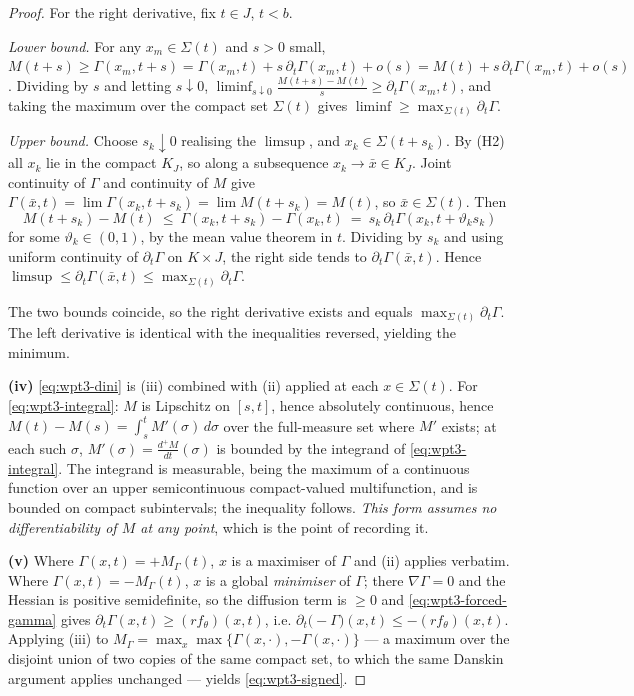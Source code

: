 \documentclass[11pt]{article}
\theoremstyle{definition}
\theoremstyle{remark}
\newcommand{\grad}{\nabla}
\begin{document}
\begin{proof}
  For the right derivative, fix $t\in J$, $t<b$.

  \emph{Lower bound.} For any $x_m\in\Sigma(t)$ and $s>0$ small,
  $M(t+s)\geq\Gamma(x_m,t+s)=\Gamma(x_m,t)+s\,\partial_t\Gamma(x_m,t)+o(s)
   =M(t)+s\,\partial_t\Gamma(x_m,t)+o(s)$. Dividing by $s$ and letting
  $s\downarrow0$,
  $\liminf_{s\downarrow0}\frac{M(t+s)-M(t)}{s}\geq\partial_t\Gamma(x_m,t)$,
  and taking the maximum over the compact set $\Sigma(t)$ gives
  $\liminf\geq\max_{\Sigma(t)}\partial_t\Gamma$.

  \emph{Upper bound.} Choose $s_k\downarrow0$ realising the $\limsup$, and
  $x_k\in\Sigma(t+s_k)$. By (H2) all $x_k$ lie in the compact $K_J$, so along
  a subsequence $x_k\to\bar x\in K_J$. Joint continuity of $\Gamma$ and
  continuity of $M$ give
  $\Gamma(\bar x,t)=\lim\Gamma(x_k,t+s_k)=\lim M(t+s_k)=M(t)$, so
  $\bar x\in\Sigma(t)$. Then
  \[
    M(t+s_k)-M(t)\ \leq\ \Gamma(x_k,t+s_k)-\Gamma(x_k,t)
      \ =\ s_k\,\partial_t\Gamma(x_k,t+\vartheta_ks_k)
  \]
  for some $\vartheta_k\in(0,1)$, by the mean value theorem in $t$. Dividing
  by $s_k$ and using uniform continuity of $\partial_t\Gamma$ on $K\times J$,
  the right side tends to $\partial_t\Gamma(\bar x,t)$. Hence
  $\limsup\leq\partial_t\Gamma(\bar x,t)\leq\max_{\Sigma(t)}\partial_t\Gamma$.

  The two bounds coincide, so the right derivative exists and equals
  $\max_{\Sigma(t)}\partial_t\Gamma$. The left derivative is identical with
  the inequalities reversed, yielding the minimum.

  \textbf{(iv)} \eqref{eq:wpt3-dini} is (iii) combined with (ii) applied at
  each $x\in\Sigma(t)$. For \eqref{eq:wpt3-integral}: $M$ is Lipschitz on
  $[s,t]$, hence absolutely continuous, hence
  $M(t)-M(s)=\int_s^tM'(\sigma)\,d\sigma$ over the full-measure set where
  $M'$ exists; at each such $\sigma$, $M'(\sigma)=\frac{d^+M}{dt}(\sigma)$ is
  bounded by the integrand of \eqref{eq:wpt3-integral}. The integrand is
  measurable, being the maximum of a continuous function over an upper
  semicontinuous compact-valued multifunction, and is bounded on compact
  subintervals; the inequality follows. \emph{This form assumes no
  differentiability of $M$ at any point}, which is the point of recording it.

  \textbf{(v)} Where $\Gamma(x,t)=+M_\Gamma(t)$, $x$ is a maximiser of
  $\Gamma$ and (ii) applies verbatim. Where $\Gamma(x,t)=-M_\Gamma(t)$, $x$
  is a global \emph{minimiser} of $\Gamma$; there $\grad\Gamma=0$ and the
  Hessian is positive semidefinite, so the diffusion term is
  $\geq0$ and \eqref{eq:wpt3-forced-gamma} gives
  $\partial_t\Gamma(x,t)\geq(rf_\theta)(x,t)$, i.e.
  $\partial_t\bigl(-\Gamma\bigr)(x,t)\leq-(rf_\theta)(x,t)$. Applying (iii)
  to $M_\Gamma=\max_x\max\{\Gamma(x,\cdot),-\Gamma(x,\cdot)\}$ --- a maximum
  over the disjoint union of two copies of the same compact set, to which the
  same Danskin argument applies unchanged --- yields \eqref{eq:wpt3-signed}.
\end{proof}
\end{document}
